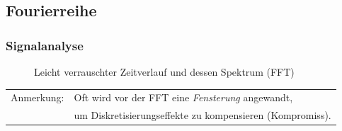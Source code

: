 \subsection{Fourierreihe}

\begin{frame}
\frametitle{Signalanalyse} 

\begin{figure}
   \setlength{\figW}{6.5cm} 
   \setlength{\figH}{5.2cm}
   
\caption*{Leicht verrauschter Zeitverlauf und dessen Spektrum (FFT)}
\end{figure}

\begin{tabular}{ll}
Anmerkung: & Oft wird vor der FFT eine \textsl{Fensterung} angewandt,  \\
 & um Diskretisierungseffekte zu kompensieren (Kompromiss).\\
\end{tabular}

\end{frame}



